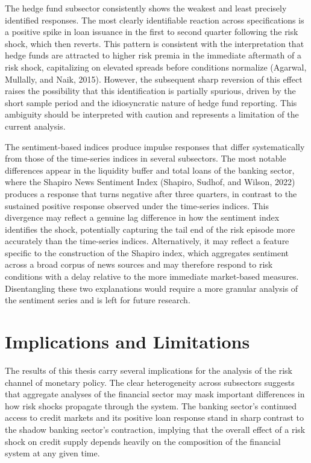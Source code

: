 \documentclass[12pt,a4paper]{report}
\begin{document}
The hedge fund subsector consistently shows the weakest and least precisely
identified responses. The most clearly identifiable reaction across specifications
is a positive spike in loan issuance in the first to second quarter following
the risk shock, which then reverts. This pattern is consistent with the
interpretation that hedge funds are attracted to higher risk premia in the
immediate aftermath of a risk shock, capitalizing on elevated spreads before
conditions normalize (Agarwal, Mullally, and Naik, 2015). However, the
subsequent sharp reversion of this effect raises the possibility that this
identification is partially spurious, driven by the short sample period and
the idiosyncratic nature of hedge fund reporting. This ambiguity should be
interpreted with caution and represents a limitation of the current analysis.

The sentiment-based indices produce impulse responses that differ systematically
from those of the time-series indices in several subsectors. The most notable
differences appear in the liquidity buffer and total loans of the banking sector,
where the Shapiro News Sentiment Index (Shapiro, Sudhof, and Wilson, 2022)
produces a response that turns negative after three quarters, in contrast to the
sustained positive response observed under the time-series indices. This divergence
may reflect a genuine lag difference in how the sentiment index identifies the
shock, potentially capturing the tail end of the risk episode more accurately than
the time-series indices. Alternatively, it may reflect a feature specific to the
construction of the Shapiro index, which aggregates sentiment across a broad
corpus of news sources and may therefore respond to risk conditions with a delay
relative to the more immediate market-based measures. Disentangling these two
explanations would require a more granular analysis of the sentiment series and
is left for future research.

\section{Implications and Limitations}

The results of this thesis carry several implications for the analysis of the risk
channel of monetary policy. The clear heterogeneity across subsectors suggests
that aggregate analyses of the financial sector may mask important differences in
how risk shocks propagate through the system. The banking sector's continued
access to credit markets and its positive loan response stand in sharp contrast
to the shadow banking sector's contraction, implying that the overall effect of
a risk shock on credit supply depends heavily on the composition of the financial
system at any given time.
\end{document}
